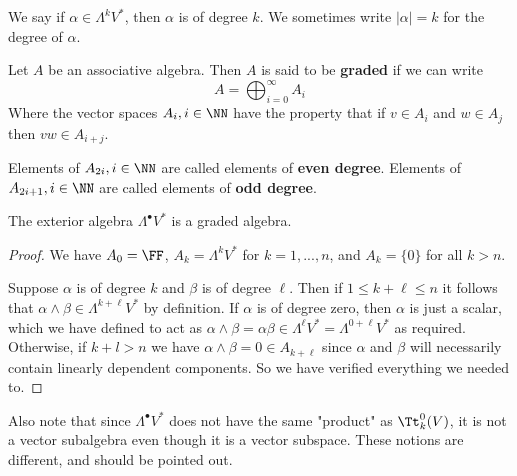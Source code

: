 We say if $\alpha \in \Lambda^k V^*$, then $\alpha$ is of degree $k$. We sometimes write $|\alpha| = k$ for the degree of $\alpha$.
\begin{defn} Let $A$ be an associative algebra. Then $A$ is said to be \textbf{graded} if we can write
\[A = \bigoplus_{i=0}^\infty A_i\]
Where the vector spaces $A_i, i\in\NN$ have the property that if $v\in A_i$ and $w \in A_j$ then $vw \in A_{i+j}$.

Elements of $A_{2i}, i\in\NN$ are called elements of \textbf{even degree}. Elements of $A_{2i+1},i\in\NN$ are called elements of \textbf{odd degree}. \label{defn:gradedalgebra}
\end{defn}
\begin{thm}The exterior algebra $\Lambda^\bullet V^*$ is a graded algebra.
\end{thm}
\begin{proof}
    We have $A_0 = \FF$, $A_k = \Lambda^k V^*$ for $k=1,...,n$, and $A_k = \{0\}$ for all $k>n$.

    Suppose $\alpha$ is of degree $k$ and $\beta$ is of degree $\ell$. Then if $1\leq k+\ell \leq n$ it follows that $\alpha\wedge \beta \in \Lambda^{k+\ell} V^*$ by definition. If $\alpha$ is of degree zero, then $\alpha$ is just a scalar, which we have defined to act as $\alpha \wedge \beta = \alpha\beta \in \Lambda^\ell V^* = \Lambda^{0+\ell}V^*$ as required. Otherwise, if $k+l>n$ we have $\alpha \wedge \beta = 0 \in A_{k+\ell}$ since $\alpha$ and $\beta$ will necessarily contain linearly dependent components. So we have verified everything we needed to.
\end{proof}

Also note that since $\Lambda^\bullet V^*$ does not have the same "product" as $\Tt_k^0(V)$, it is not a vector subalgebra even though it is a vector subspace. These notions are different, and should be pointed out.

